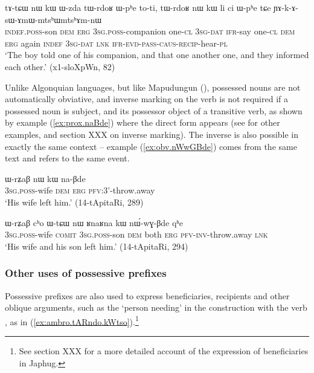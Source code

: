  \begin{exe}
\ex \label{ex:Wzda.tWrdoR}
\gll tɤ-tɕɯ nɯ kɯ ɯ-zda tɯ-rdoʁ ɯ-pʰe to-ti, tɯ-rdoʁ nɯ kɯ li ci ɯ-pʰe tɕe ɲɤ-k-ɤ-sɯ-ɤmɯ-mtsʰɯ\redp{}mtsʰɤm-nɯ \\
\textsc{indef.poss}-son \textsc{dem} \textsc{erg} \textsc{3sg.poss}-companion one-\textsc{cl} \textsc{3sg-dat} \textsc{ifr}-say one-\textsc{cl}  \textsc{dem} \textsc{erg} again \textsc{indef} \textsc{3sg-dat} \textsc{lnk}   \textsc{ifr}-\textsc{evd}-\textsc{pass}-\textsc{caus}-\textsc{recip}-hear-\textsc{pl} \\
\glt `The boy told one of his companion, and that one another one, and they informed each other.' (x1-sloXpWn, 82)
\end{exe}

Unlike Algonquian languages, but like Mapudungun (\citealt{haude16symmetrical}), possessed nouns are not automatically obviative, and inverse marking on the verb is not required if a possessed noun is subject, and its possessor object of a transitive verb, as shown by example (\ref{ex:prox.naBde}) where the direct form  appears (see \citealt{jacques10inverse} for other examples, and section XXX on inverse marking). The inverse  is also possible in exactly the same context -- example  (\ref{ex:obv.nWwGBde}) comes from the same text and refers to the same event.

\begin{exe}
\ex \label{ex:prox.naBde}
\gll ɯ-rʑaβ nɯ kɯ na-βde \\
\textsc{3sg.poss}-wife \textsc{dem} \textsc{erg} \textsc{pfv}:3'-throw.away \\
\glt `His wife left him.' (14-tApitaRi, 289)
\end{exe}

\begin{exe}
\ex \label{ex:obv.nWwGBde}
\gll
ɯ-rʑaβ cʰo ɯ-tɕɯ nɯ ʁnaʁna kɯ nɯ́-wɣ-βde qʰe \\
\textsc{3sg.poss}-wife \textsc{comit} \textsc{3sg.poss}-son \textsc{dem} both \textsc{erg} \textsc{pfv}-\textsc{inv}-throw.away \textsc{lnk} \\
\glt `His wife and his son left him.' (14-tApitaRi, 294)
\end{exe}

\subsubsection{Other uses of possessive prefixes}
Possessive prefixes are also used to express beneficiaries, recipients and other oblique arguments, such as the `person needing' in the construction with the verb ,  as in (\ref{ex:ambro.tARndo.kWtso}).\footnote{See section XXX for a more detailed account of the expression of beneficiaries in Japhug.}

